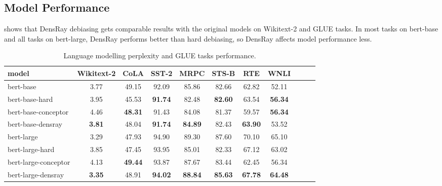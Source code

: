 \subsection{Model Performance}
 shows that DensRay debiasing gets comparable results with
the original models on Wikitext-2 and GLUE tasks. In most tasks on bert-base and all tasks on bert-large, DensRay performs better than hard debiasing, so DensRay affects model performance less.
\begin{table}[h]
	\centering
	\footnotesize
	\begin{tabular}{lcccccccccc}
		\hline
		model & Wikitext-2&CoLA &SST-2&MRPC&STS-B&RTE&WNLI\\
		\hline
		bert-base &3.77&49.15&92.09&85.86&82.66&62.82&52.11\\
		bert-base-hard &3.95&45.53&\textbf{91.74}&82.48&\textbf{82.60}&63.54&\textbf{56.34}\\
		bert-base-conceptor &4.46&\textbf{48.31}&91.43&84.08&81.37&59.57&\textbf{56.34}\\
		bert-base-densray &\textbf{3.81}&48.04&\textbf{91.74}&\textbf{84.89}&82.43&\textbf{63.90}&53.52\\
		\hline
		bert-large &3.29& 47.93&94.90&89.30&87.60&70.10&65.10\\
		bert-large-hard &3.85& 47.45&93.95&85.01&82.33&67.12&63.02\\
		bert-large-conceptor &4.13&\textbf{49.44}&93.87&87.67&83.44&62.45&56.34\\
		bert-large-densray &\textbf{3.35}& 48.91&\textbf{94.02}&\textbf{88.84}&\textbf{85.63}&\textbf{67.78}&\textbf{64.48}\\
		\hline
	\end{tabular}
	\caption{
		Language modelling perplexity and GLUE tasks
		performance. }
\end{table}

